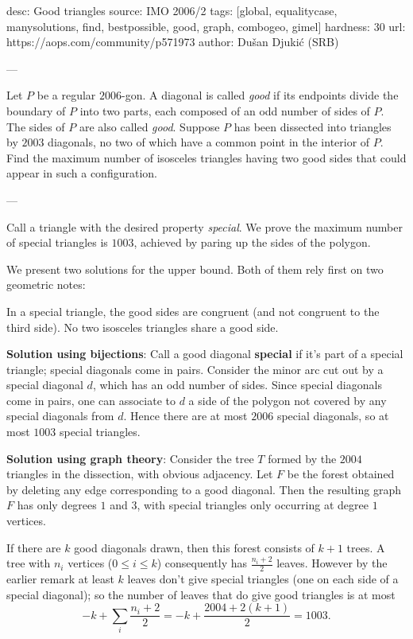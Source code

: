 desc:  Good triangles
source:  IMO 2006/2
tags:  [global, equalitycase, manysolutions, find, bestpossible, good, graph, combogeo, gimel]
hardness: 30
url: https://aops.com/community/p571973
author: Dušan Djukić (SRB)

---

Let $P$ be a regular $2006$-gon.
A diagonal is called \emph{good} if its endpoints
divide the boundary of $P$ into two parts,
each composed of an odd number of sides of $P$.
The sides of $P$ are also called \emph{good}.
Suppose $P$ has been dissected into triangles by $2003$ diagonals,
no two of which have a common point in the interior of $P$.
Find the maximum number of isosceles triangles having two good
sides that could appear in such a configuration.

---

Call a triangle with the desired property \emph{special}.
We prove the maximum number of special triangles is $1003$,
achieved by paring up the sides of the polygon.

We present two solutions for the upper bound.
Both of them rely first on two geometric notes:
\begin{itemize}
  \ii In a special triangle, the good sides are congruent
  (and not congruent to the third side).
  \ii No two isosceles triangles share a good side.
\end{itemize}

\textbf{Solution using bijections}:
Call a good diagonal \textbf{special} if it's part of a special triangle;
special diagonals come in pairs.
Consider the minor arc cut out by a special diagonal $d$,
which has an odd number of sides.
Since special diagonals come in pairs,
one can associate to $d$ a side of the polygon
not covered by any special diagonals from $d$.
Hence there are at most $2006$ special diagonals,
so at most $1003$ special triangles.

\textbf{Solution using graph theory}:
Consider the tree $T$ formed by the $2004$
triangles in the dissection, with obvious adjacency.
Let $F$ be the forest obtained by deleting
any edge corresponding to a good diagonal.
Then the resulting graph $F$ has only degrees $1$ and $3$,
with special triangles only occurring at degree $1$ vertices.

If there are $k$ good diagonals drawn,
then this forest consists of $k+1$ trees.
A tree with $n_i$ vertices ($0 \le i \le k$)
consequently has $\frac{n_i+2}{2}$ leaves.
However by the earlier remark at least $k$ leaves
don't give special triangles
(one on each side of a special diagonal);
so the number of leaves that do give good triangles is at most
\[ -k + \sum_i \frac{n_i+2}{2}
  = -k + \frac{2004 + 2(k+1)}{2} = 1003. \]
